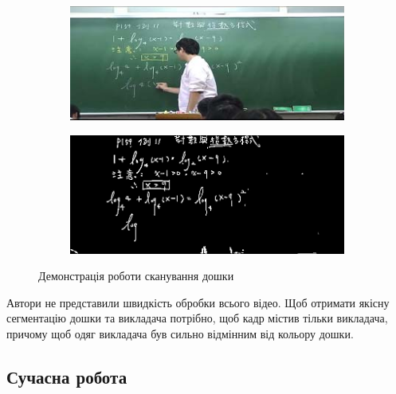 \begin{figure}[h]
  \centering
  \begin{subfigure}[b]{0.3\textwidth}
    \centering
    \includegraphics[width=\textwidth]{images/yeh_1}
  \end{subfigure}
  \begin{subfigure}[b]{0.3\textwidth}
    \centering
    \includegraphics[width=\textwidth]{images/yeh_2}
  \end{subfigure}
  \label{fig:yeh}
  \caption{Демонстрація роботи сканування дошки}
\end{figure}

Автори не представили швидкість обробки всього відео. Щоб отримати якісну сегментацію
дошки та викладача потрібно, щоб кадр містив тільки викладача, причому щоб одяг викладача
був сильно відмінним від кольору дошки.

\subsection{Сучасна робота}


